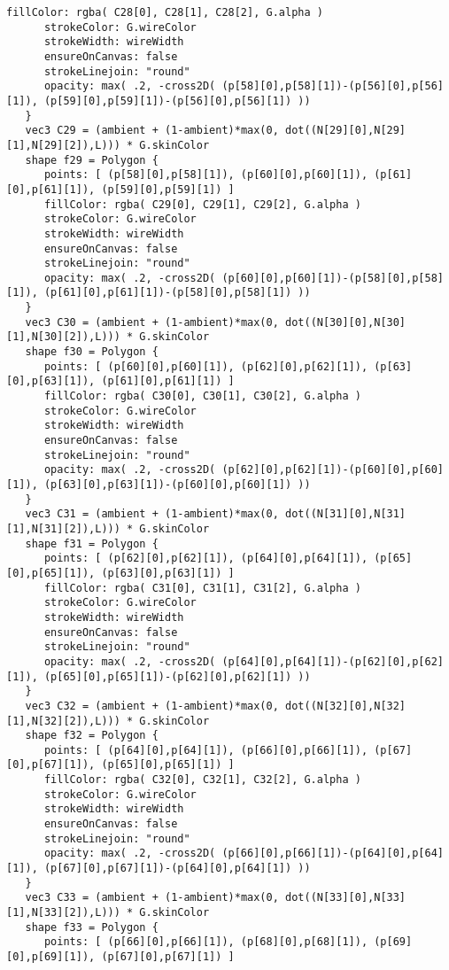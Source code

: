 \begin{lstlisting}[language=Sty-RT,escapechar=@]
      fillColor: rgba( C28[0], C28[1], C28[2], G.alpha )
      strokeColor: G.wireColor
      strokeWidth: wireWidth
      ensureOnCanvas: false
      strokeLinejoin: "round"
      opacity: max( .2, -cross2D( (p[58][0],p[58][1])-(p[56][0],p[56][1]), (p[59][0],p[59][1])-(p[56][0],p[56][1]) ))
   }
   vec3 C29 = (ambient + (1-ambient)*max(0, dot((N[29][0],N[29][1],N[29][2]),L))) * G.skinColor
   shape f29 = Polygon {
      points: [ (p[58][0],p[58][1]), (p[60][0],p[60][1]), (p[61][0],p[61][1]), (p[59][0],p[59][1]) ]
      fillColor: rgba( C29[0], C29[1], C29[2], G.alpha )
      strokeColor: G.wireColor
      strokeWidth: wireWidth
      ensureOnCanvas: false
      strokeLinejoin: "round"
      opacity: max( .2, -cross2D( (p[60][0],p[60][1])-(p[58][0],p[58][1]), (p[61][0],p[61][1])-(p[58][0],p[58][1]) ))
   }
   vec3 C30 = (ambient + (1-ambient)*max(0, dot((N[30][0],N[30][1],N[30][2]),L))) * G.skinColor
   shape f30 = Polygon {
      points: [ (p[60][0],p[60][1]), (p[62][0],p[62][1]), (p[63][0],p[63][1]), (p[61][0],p[61][1]) ]
      fillColor: rgba( C30[0], C30[1], C30[2], G.alpha )
      strokeColor: G.wireColor
      strokeWidth: wireWidth
      ensureOnCanvas: false
      strokeLinejoin: "round"
      opacity: max( .2, -cross2D( (p[62][0],p[62][1])-(p[60][0],p[60][1]), (p[63][0],p[63][1])-(p[60][0],p[60][1]) ))
   }
   vec3 C31 = (ambient + (1-ambient)*max(0, dot((N[31][0],N[31][1],N[31][2]),L))) * G.skinColor
   shape f31 = Polygon {
      points: [ (p[62][0],p[62][1]), (p[64][0],p[64][1]), (p[65][0],p[65][1]), (p[63][0],p[63][1]) ]
      fillColor: rgba( C31[0], C31[1], C31[2], G.alpha )
      strokeColor: G.wireColor
      strokeWidth: wireWidth
      ensureOnCanvas: false
      strokeLinejoin: "round"
      opacity: max( .2, -cross2D( (p[64][0],p[64][1])-(p[62][0],p[62][1]), (p[65][0],p[65][1])-(p[62][0],p[62][1]) ))
   }
   vec3 C32 = (ambient + (1-ambient)*max(0, dot((N[32][0],N[32][1],N[32][2]),L))) * G.skinColor
   shape f32 = Polygon {
      points: [ (p[64][0],p[64][1]), (p[66][0],p[66][1]), (p[67][0],p[67][1]), (p[65][0],p[65][1]) ]
      fillColor: rgba( C32[0], C32[1], C32[2], G.alpha )
      strokeColor: G.wireColor
      strokeWidth: wireWidth
      ensureOnCanvas: false
      strokeLinejoin: "round"
      opacity: max( .2, -cross2D( (p[66][0],p[66][1])-(p[64][0],p[64][1]), (p[67][0],p[67][1])-(p[64][0],p[64][1]) ))
   }
   vec3 C33 = (ambient + (1-ambient)*max(0, dot((N[33][0],N[33][1],N[33][2]),L))) * G.skinColor
   shape f33 = Polygon {
      points: [ (p[66][0],p[66][1]), (p[68][0],p[68][1]), (p[69][0],p[69][1]), (p[67][0],p[67][1]) ]

\end{lstlisting}
